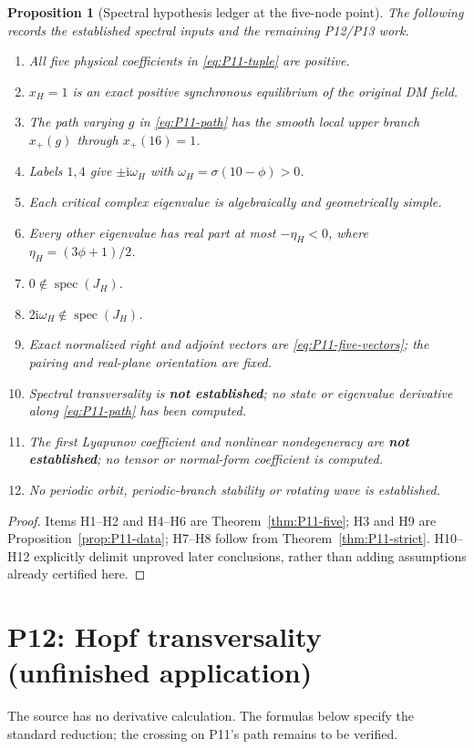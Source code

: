 \documentclass[11pt]{article}
\newcommand{\ii}{\mathrm{i}}
\DeclareMathOperator{\spec}{spec}
\newtheorem{proposition}[theorem]{Proposition}
\theoremstyle{definition}
\theoremstyle{remark}
\begin{document}
\begin{proposition}[Spectral hypothesis ledger at the five-node point]
\label{prop:P11-ledger}
The following records the established spectral inputs and the remaining P12/P13 work.
\begin{enumerate}[label=H\arabic*.,leftmargin=3em]
 \item All five physical coefficients in \eqref{eq:P11-tuple} are positive.
 \item $x_H=1$ is an exact positive synchronous equilibrium of the original DM field.
 \item The path varying $g$ in \eqref{eq:P11-path} has the smooth local
       upper branch $x_+(g)$ through $x_+(16)=1$.
 \item Labels $1,4$ give $\pm\ii\omega_H$ with $\omega_H=\sigma(10-\phi)>0$.
 \item Each critical complex eigenvalue is algebraically and geometrically simple.
 \item Every other eigenvalue has real part at most $-\eta_H<0$,
       where $\eta_H=(3\phi+1)/2$.
 \item $0\notin\spec(J_H)$.
 \item $2\ii\omega_H\notin\spec(J_H)$.
 \item Exact normalized right and adjoint vectors are \eqref{eq:P11-five-vectors};
       the pairing and real-plane orientation are fixed.
 \item Spectral transversality is \textbf{not established}; no state or
       eigenvalue derivative along \eqref{eq:P11-path} has been computed.
 \item The first Lyapunov coefficient and nonlinear nondegeneracy are
       \textbf{not established}; no tensor or normal-form coefficient is computed.
 \item No periodic orbit, periodic-branch stability or rotating wave is established.
\end{enumerate}
\end{proposition}
\begin{proof}
Items H1--H2 and H4--H6 are Theorem~\ref{thm:P11-five}; H3 and
H9 are Proposition~\ref{prop:P11-data}; H7--H8 follow from
Theorem~\ref{thm:P11-strict}. H10--H12 explicitly delimit unproved
later conclusions, rather than adding assumptions already certified here.
\end{proof}


\section{P12: Hopf transversality (unfinished application)}
\label{sec:P12}
The source has no derivative calculation. The formulas below specify
the standard reduction; the crossing on P11's path remains to be verified.
\end{document}
